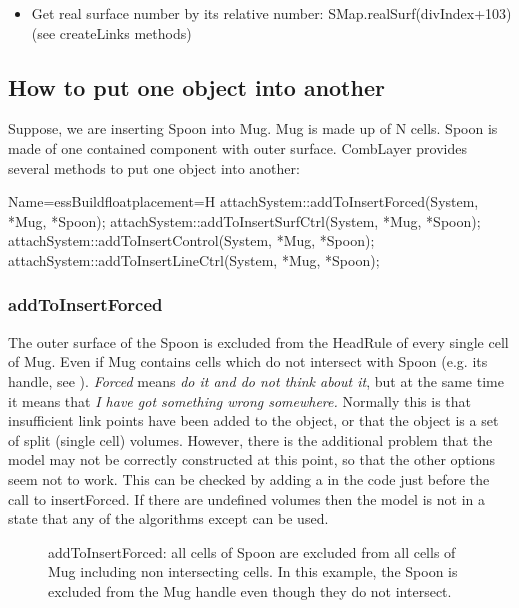 \begin{itemize}
\item Get real surface number by its relative number: SMap.realSurf(divIndex+103) (see createLinks methods)
\end{itemize}

\subsection{How to put one object into another}

Suppose, we are inserting Spoon into Mug.
Mug is made up of N cells. Spoon is made of one contained component with outer surface.
CombLayer provides several methods to put one object into another:

\begin{cpp}{Name=essBuild}{floatplacement=H}
attachSystem::addToInsertForced(System,   *Mug, *Spoon);
attachSystem::addToInsertSurfCtrl(System, *Mug, *Spoon);
attachSystem::addToInsertControl(System,  *Mug, *Spoon);
attachSystem::addToInsertLineCtrl(System, *Mug, *Spoon);
\end{cpp}

\subsubsection{addToInsertForced}

The outer surface of the Spoon is excluded from the HeadRule of every single cell of Mug.
Even if Mug contains cells which do not intersect with Spoon (e.g. its handle, see ).
{\it Forced} means {\it do it and do not think about it}, but at the same time it means that
{\it I have got something wrong somewhere.}  Normally this is that insufficient link points have been added
to the object, or that the object is a set of split (single cell) volumes.  However, there is the additional
problem that the model may not be correctly constructed at this point, so that the other options seem not to work.
This can be checked by adding a
in the code just before the call to insertForced. If there are undefined volumes then the model is not in a state that
any of the  algorithms except  can be used.

\begin{figure}
  \centering
  \caption{addToInsertForced: all cells of Spoon are excluded from all cells of Mug including non intersecting cells. In this example, the Spoon is excluded from the Mug handle even though
  they do not intersect.}
  \label{fig:forced}
\end{figure}


